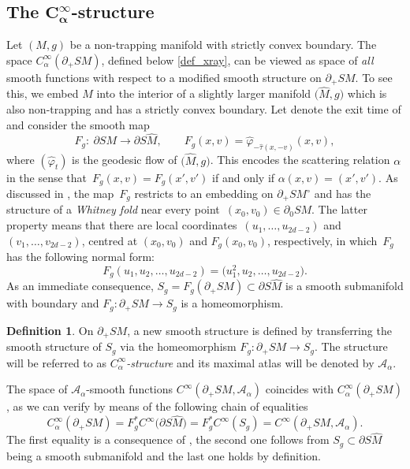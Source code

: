 \documentclass[10pt,a4paper]{amsart}
\numberwithin{equation}{section}
\theoremstyle{definition}
\newtheorem{Definition}[Theorem]{Definition}
\newcommand{\1}{{\bf 1}}
\begin{document}
\subsection[The C\_alpha\^{}infty-structure]{The $\boldsymbol{C_\alpha^\infty}$-structure}\label{s_calpha}

Let $(M,g)$ be a non-trapping manifold with strictly convex boundary. The space $C_\alpha^\infty(\partial_+SM)$, defined below \eqref{def_xray}, can be viewed as space of {\it all} smooth functions with respect to a modified smooth structure on $\partial_+SM$.
To see this, we embed $M$ into the interior of a slightly larger manifold $\bigl(\hat M,g\bigr)$ which is also non-trapping and has a strictly convex boundary. Let \smash{$\hat \tau \in C^\infty(SM,[0,\infty))$} denote the exit time of  and consider the smooth map
\begin{equation}\label{def_foldmap}
	F_g\colon \ \partial SM\rightarrow \partial S\hat M,\qquad F_g(x,v) = \hat \varphi_{-\hat \tau(x,-v)}(x,v),
\end{equation}
where $(\hat \varphi_t)$ is the geodesic flow of $\bigl(\hat M,g\bigr)$. This encodes the scattering relation $\alpha$ in the sense that~${F_g(x,v)=F_g(x',v')}$ if and only if $\alpha(x,v)=(x',v')$.
 As discussed in \cite[Section~5.2]{PSU23}, the map~$F_g$ restricts to an embedding on $\partial_+SM^\circ$ and has the structure of a {\it Whitney fold} near every point~$(x_0,v_0)\in \partial_0SM$. The latter property means that there are local coordinates~${(u_1,\dots, u_{2d-2})}$ and~$(v_1,\dots, v_{2d-2})$, centred at $(x_0,v_0)$ and $F_g(x_0,v_0)$, respectively, in which~$F_g$ has the following normal form:
\begin{equation}\label{whitneynormalform}
	F_g(u_1,u_2,\dots, u_{2d-2}) = \bigl(u_1^2,u_2,\dots, u_{2d-2}\bigr).
\end{equation}
As an immediate consequence, $S_g=F_g(\partial_+SM)\subset \partial S\hat M$ is a smooth submanifold with boundary and $F_g\colon \partial_+SM\rightarrow S_g$ is a homeomorphism.

\begin{Definition}
	On $\partial_+SM$, a new smooth structure is defined by transferring the smooth structure of $S_g$ via the homeomorphism $F_g\colon \partial_+SM\rightarrow S_g$. The structure will be referred to as {\it $C_\alpha^\infty$-structure} and its maximal atlas will be denoted by $\mathcal A_\alpha$.
\end{Definition}

The space of $\mathcal A_\alpha$-smooth functions $C^\infty(\partial_+SM,\mathcal A_\alpha)$ coincides with $C^\infty_\alpha(\partial_+SM)$, as we can verify by means of the following chain of equalities
\[
	C_\alpha^\infty(\partial_+SM) =F_g^*C^\infty\bigl(\partial S\hat M\bigr) = F_g^*C^\infty(S_g) = C^\infty(\partial_+SM,\mathcal A_\alpha).
\]
The first equality is a consequence of \cite[Theorem~C.4.4]{Hor07}, the second one follows from $S_g\subset \partial S \hat M$ being a smooth submanifold and the last one holds by definition.
\end{document}

